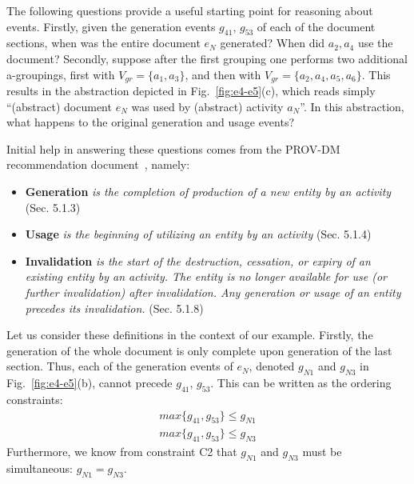 The following questions provide a useful starting point for reasoning about events. Firstly, given the generation events $g_{41}$, $g_{53}$  of each of the document sections, when was the entire document $e_N$ generated? 
%
When did $a_2, a_4$ use the document? 
%
Secondly,  suppose after the first grouping one performs two additional a-groupings, first with $V_{gr} = \{a_1, a_3\}$, and then with $V_{gr} = \{a_2, a_4, a_5, a_6\}$.
%
 This results in the abstraction depicted in Fig.~\ref{fig:e4-e5}(c), which reads simply ``(abstract) document $e_N$ was used by (abstract) activity $a_N$''. 
 In this abstraction, what happens to the original generation and usage events?

Initial help in answering these questions comes from the PROV-DM recommendation document~\citep{w3c-prov-dm}, namely:
\begin{itemize}
\item\textbf{Generation} \textit{is the completion of production of a new entity by an activity} (Sec. 5.1.3)
\item\textbf{Usage} \textit{is the beginning of utilizing an entity by an activity} (Sec. 5.1.4)
\item\textbf{Invalidation} \textit{is the start of the destruction, cessation, or expiry of an existing entity by an activity. The entity is no longer available for use (or further invalidation) after invalidation. Any generation or usage of an entity precedes its invalidation.} (Sec. 5.1.8)
\end{itemize}

%
Let us consider these definitions in the context of our example. Firstly, the generation of the whole document is only complete upon generation of the last section. Thus, each of the generation events of $e_N$, denoted $g_{N1}$ and $g_{N3}$ in Fig.~\ref{fig:e4-e5}(b), cannot precede $g_{41}$, $g_{53}$. This can be written as the ordering constraints:
\begin{align}
 \label{eq:gprime-order1}
max\{g_{41}, g_{53}\} \leq g_{N1} \\
max\{g_{41}, g_{53}\}  \leq g_{N3}
\end{align}
Furthermore, we know from constraint C2 that $g_{N1}$ and $g_{N3}$ must be simultaneous:
$g_{N1} = g_{N3}$.


